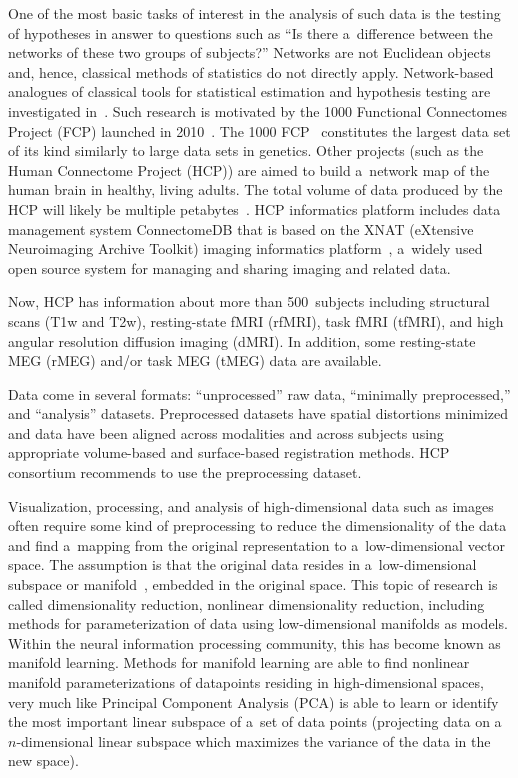 \begin{multicols}{2}
  One of the most basic tasks of interest in the analysis of such data is the testing of
hypotheses in answer to questions such as ``Is there a~difference between the
networks of these two groups of subjects?'' Networks are not Euclidean objects and,
hence, classical methods of statistics do not directly apply. Network-based analogues
of classical tools for statistical estimation and hypothesis testing are
investigated in~\cite{64-kl, 65-kl}. Such research is motivated by the 1000 Functional
Connectomes Project (FCP) launched in 2010~\cite{62-kl}.
  The 1000 FCP~\cite{66-kl} constitutes the largest data set of its kind similarly to
large data sets in genetics. Other projects (such as the Human Connectome Project
(HCP)) are aimed to build a~network map of the human brain in healthy, living adults.
The total volume of data produced by the HCP will likely be multiple
petabytes~\cite{67-kl}. HCP informatics platform includes data management system
ConnectomeDB that is based on the XNAT (eXtensive Neuroimaging Archive Toolkit)
imaging informatics
  platform~\cite{68-kl}, a~widely used open source system for managing and sharing
imaging and related data.

  Now, HCP has information about more than 500~subjects including structural scans
(T1w and T2w), resting-state fMRI (rfMRI), task fMRI (tfMRI), and high angular
resolution diffusion imaging (dMRI). In addition, some resting-state MEG (rMEG)
and/or task MEG (tMEG) data are available.

  Data come in several formats: ``unprocessed'' raw data, ``minimally
preprocessed,'' and ``analysis'' datasets. Preprocessed datasets have spatial distortions
minimized and data have been aligned across modalities and across subjects using
appropriate volume-based and surface-based registration methods. HCP consortium
recommends to use the preprocessing dataset.

  Visualization, processing, and analysis of high-dimensional data such as images
often require some kind of preprocessing to reduce the dimensionality of the data
and find a~mapping from the original representation to a~low-dimensional vector
space. The assumption is that the original data resides in a~low-dimensional subspace
or manifold~\cite{69-kl}, embedded in the original space. This topic of research is
called dimensionality reduction, nonlinear dimensionality reduction, including
methods for parameterization of data using low-dimensional manifolds as models.
Within the neural information processing community, this has become known as
manifold learning. Methods for manifold learning are able to find nonlinear
manifold parameterizations of datapoints residing in high-dimensional spaces, very
much like Principal Component Analysis (PCA) is able to learn or identify the most
important linear subspace of a~set of data points (projecting data on a~$n$-dimensional
linear subspace which maximizes the variance of the data in the new space).
{

}
\end{multicols}

